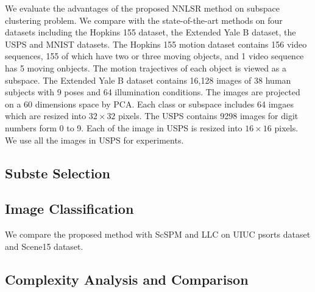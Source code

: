 \documentclass[10pt,twocolumn,letterpaper]{article}
\begin{document}
We evaluate the advantages of the proposed NNLSR method on subspace clustering problem. We compare with the state-of-the-art methods on four datasets including the Hopkins 155 dataset, the Extended Yale B dataset, the USPS and MNIST datasets. The Hopkins 155 motion dataset contains 156 video sequences, 155 of which have two or three moving objects, and 1 video sequence has 5 moving onbjects. The motion trajectives of each object is viewed as a subspace. The Extended Yale B dataset contains 16,128 images of 38 human subjects with 9 poses and 64 illumination conditions. The images are projected on a 60 dimensions space by PCA. Each class or subspace includes 64 imgaes which are resized into $32\times32$ pixels. The USPS contains 9298 images for digit numbers form 0 to 9. Each of the image in USPS is resized into $16\times16$ pixels. We use all the images in USPS for experiments.



\subsection{Subste Selection}





\subsection{Image Classification}
We compare the proposed method with ScSPM \cite{} and LLC \cite{} on UIUC psorts dataset \cite{} and Scene15 \cite{} dataset. 


\subsection{Complexity Analysis and Comparison}

{
\small


}
\end{document}
